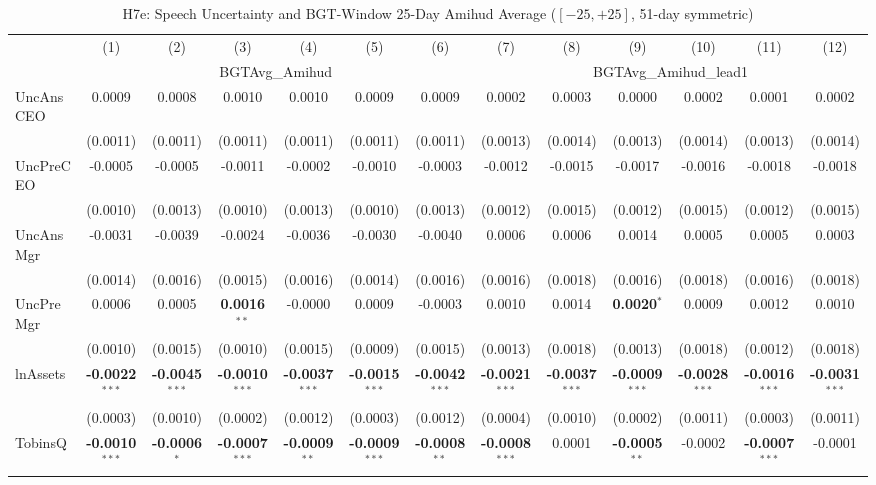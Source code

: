 \documentclass[11pt,a4paper]{article}
\begin{document}
\clearpage
\begin{table}[htbp]
\centering
\caption{H7e: Speech Uncertainty and BGT-Window 25-Day Amihud Average ($[-25,+25]$, 51-day symmetric)}
\label{tab:h7e}
\scriptsize
\begin{tabular}{lcccccccccccc}
\toprule
 & (1) & (2) & (3) & (4) & (5) & (6) & (7) & (8) & (9) & (10) & (11) & (12) \\
 & \multicolumn{6}{c}{BGTAvg\_Amihud} & \multicolumn{6}{c}{BGTAvg\_Amihud\_lead1} \\
\cmidrule(lr){2-7} \cmidrule(lr){8-13}
\midrule
UncAnsCEO & 0.0009 & 0.0008 & 0.0010 & 0.0010 & 0.0009 & 0.0009 & 0.0002 & 0.0003 & 0.0000 & 0.0002 & 0.0001 & 0.0002 \\
 & (0.0011) & (0.0011) & (0.0011) & (0.0011) & (0.0011) & (0.0011) & (0.0013) & (0.0014) & (0.0013) & (0.0014) & (0.0013) & (0.0014) \\
UncPreCEO & -0.0005 & -0.0005 & -0.0011 & -0.0002 & -0.0010 & -0.0003 & -0.0012 & -0.0015 & -0.0017 & -0.0016 & -0.0018 & -0.0018 \\
 & (0.0010) & (0.0013) & (0.0010) & (0.0013) & (0.0010) & (0.0013) & (0.0012) & (0.0015) & (0.0012) & (0.0015) & (0.0012) & (0.0015) \\
UncAnsMgr & -0.0031 & -0.0039 & -0.0024 & -0.0036 & -0.0030 & -0.0040 & 0.0006 & 0.0006 & 0.0014 & 0.0005 & 0.0005 & 0.0003 \\
 & (0.0014) & (0.0016) & (0.0015) & (0.0016) & (0.0014) & (0.0016) & (0.0016) & (0.0018) & (0.0016) & (0.0018) & (0.0016) & (0.0018) \\
UncPreMgr & 0.0006 & 0.0005 & \textbf{0.0016}$^{**}$ & -0.0000 & 0.0009 & -0.0003 & 0.0010 & 0.0014 & \textbf{0.0020}$^{*}$ & 0.0009 & 0.0012 & 0.0010 \\
 & (0.0010) & (0.0015) & (0.0010) & (0.0015) & (0.0009) & (0.0015) & (0.0013) & (0.0018) & (0.0013) & (0.0018) & (0.0012) & (0.0018) \\
\midrule
lnAssets & \textbf{-0.0022}$^{***}$ & \textbf{-0.0045}$^{***}$ & \textbf{-0.0010}$^{***}$ & \textbf{-0.0037}$^{***}$ & \textbf{-0.0015}$^{***}$ & \textbf{-0.0042}$^{***}$ & \textbf{-0.0021}$^{***}$ & \textbf{-0.0037}$^{***}$ & \textbf{-0.0009}$^{***}$ & \textbf{-0.0028}$^{***}$ & \textbf{-0.0016}$^{***}$ & \textbf{-0.0031}$^{***}$ \\
 & (0.0003) & (0.0010) & (0.0002) & (0.0012) & (0.0003) & (0.0012) & (0.0004) & (0.0010) & (0.0002) & (0.0011) & (0.0003) & (0.0011) \\
TobinsQ & \textbf{-0.0010}$^{***}$ & \textbf{-0.0006}$^{*}$ & \textbf{-0.0007}$^{***}$ & \textbf{-0.0009}$^{**}$ & \textbf{-0.0009}$^{***}$ & \textbf{-0.0008}$^{**}$ & \textbf{-0.0008}$^{***}$ & 0.0001 & \textbf{-0.0005}$^{**}$ & -0.0002 & \textbf{-0.0007}$^{***}$ & -0.0001 \\

\end{tabular}
\end{table}
\end{document}
